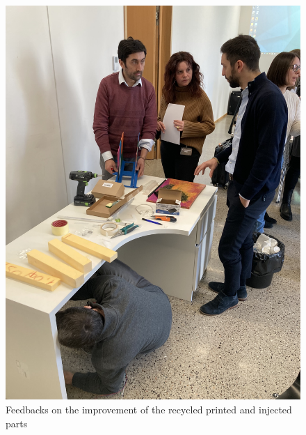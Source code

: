 \documentclass[
  11pt,
]{article}
\begin{document}
\begin{figure}
\begin{minipage}[t]{0.35\linewidth}
{{\includegraphics{figures/demos/desk/desk-05.jpg}

}

}

\end{minipage}%

\caption{\label{fig-desk-final}Feedbacks on the improvement of the
recycled printed and injected parts}

\end{figure}
\end{document}
